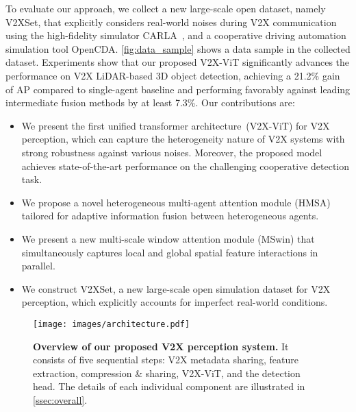 \documentclass[runningheads]{llncs}
\begin{document}
To evaluate our approach, we collect a new large-scale open dataset,  namely V2XSet, that explicitly considers real-world noises during V2X communication using the high-fidelity simulator CARLA~\cite{Dosovitskiy17}, and a cooperative driving automation simulation tool OpenCDA. \cref{fig:data_sample} shows a data sample in the collected dataset. Experiments show that our proposed V2X-ViT significantly advances the performance on V2X LiDAR-based 3D object detection, achieving a 21.2\% gain of AP compared to single-agent baseline and performing favorably against leading intermediate fusion methods by at least 7.3\%.
Our contributions are:
\begin{itemize}[leftmargin=*]
\itemsep0em
    \item We present the first unified transformer architecture~(V2X-ViT) for V2X perception, which can capture the heterogeneity nature of V2X systems with strong robustness against various noises. Moreover, the proposed model achieves state-of-the-art performance on the challenging cooperative detection task.
\item We propose a novel heterogeneous multi-agent attention module (HMSA) tailored for adaptive information fusion between heterogeneous agents.
\item We present a new multi-scale window attention module (MSwin) that simultaneously captures local and global spatial feature interactions in parallel.
\item We construct V2XSet, a new large-scale open simulation dataset for V2X perception, which explicitly accounts for imperfect real-world conditions.
\end{itemize}

\begin{figure*}[!t]
\centering
\texttt{[image: images/architecture.pdf]}
\caption{\textbf{Overview of our proposed V2X perception system.} It consists of five sequential steps: V2X metadata sharing, feature extraction, compression \& sharing, V2X-ViT, and the detection head. The details of each individual component are illustrated in \cref{ssec:overall}.}
\label{fig:Architecture}
\vspace{-3mm}
\end{figure*}
\end{document}
